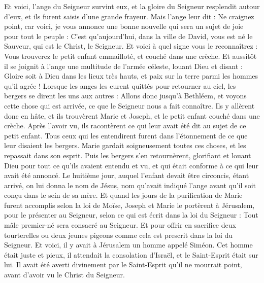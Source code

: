 \begin{multicols}{2}
Et voici, l'ange du Seigneur survint eux, et la gloire du Seigneur resplendit autour d'eux, et ils furent saisis d'une grande frayeur.
Mais l’ange leur dit : Ne craignez point, car voici, je vous annonce une bonne nouvelle qui sera un sujet de joie pour tout le peuple :
C’est qu'aujourd'hui, dans la ville de David, vous est né le Sauveur, qui est le Christ, le Seigneur.
Et voici à quel signe vous le reconnaîtrez : Vous trouverez le petit enfant emmailloté, et couché dans une crèche.
Et aussitôt il se joignit à l'ange une multitude de l'armée céleste, louant Dieu et disant :
Gloire soit à Dieu dans les lieux très hauts, et paix sur la terre parmi les hommes qu’il agrée !
Lorsque les anges les eurent quittés pour retourner au ciel, les bergers se dirent les uns aux autres : Allons donc jusqu'à Bethléem, et voyons cette chose qui est arrivée, ce que le Seigneur nous a fait connaître.
Ils y allèrent donc en hâte, et ils trouvèrent Marie et Joseph, et le petit enfant couché dans une crèche.
Après l’avoir vu, ils racontèrent ce qui leur avait été dit au sujet de ce petit enfant.
Tous ceux qui les entendirent furent dans l’étonnement de ce que leur disaient les bergers.
Marie gardait soigneusement toutes ces choses, et les repassait dans son esprit.
Puis les bergers s'en retournèrent, glorifiant et louant Dieu pour tout ce qu’ils avaient entendu et vu, et qui était conforme à ce qui leur avait été annoncé.
Le huitième jour, auquel l'enfant devait être circoncis, étant arrivé, on lui donna le nom de Jésus, nom qu’avait indiqué l'ange avant qu'il soit conçu dans le sein de sa mère.
Et quand les jours de la purification de Marie furent accomplis selon la loi de Moïse, Joseph et Marie le portèrent à Jérusalem, pour le présenter au Seigneur,
selon ce qui est écrit dans la loi du Seigneur : Tout mâle premier-né sera consacré au Seigneur.
Et pour offrir en sacrifice deux tourterelles ou deux jeunes pigeons comme cela est prescrit dans la loi du Seigneur.
Et voici, il y avait à Jérusalem un homme appelé Siméon. Cet homme était juste et pieux, il attendait la consolation d'Israël, et le Saint-Esprit était sur lui.
Il avait été averti divinement par le Saint-Esprit qu'il ne mourrait point, avant d’avoir vu le Christ du Seigneur.

\end{multicols}

